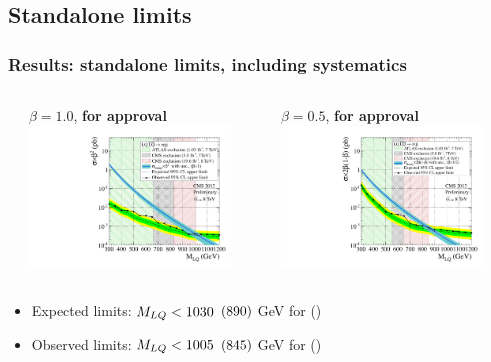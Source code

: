 \documentclass[bigger]{beamer}
\providecommand{\alert}[1]{\textbf{#1}}
\begin{document}
\subsection{Standalone limits}
\label{sec-5-1}
\begin{frame}
\frametitle{Results: standalone limits, including systematics}
\label{sec-5-1-1}
\begin{columns} %
\label{sec-5-1-1-1}
\begin{column}{0.5\textwidth}
\label{sec-5-1-1-1-1}

\centering
$\beta = 1.0$, \alert{for approval}
\includegraphics[width=0.875\textwidth]{fig/limits/BR_Sigma_EE.pdf}
\end{column}
\begin{column}{0.5\textwidth}
\label{sec-5-1-1-1-2}

\centering
$\beta = 0.5$, \alert{for approval}
\includegraphics[width=0.875\textwidth]{fig/limits/BR_Sigma_ENu.pdf}
\end{column}
\end{columns}
\label{sec-5-1-1-2}

\begin{itemize}
\item Expected limits: $M_{LQ} < 1030$ $(890)$ GeV for \eejj (\enujj)
\item Observed limits: $M_{LQ} < 1005$ $(845)$ GeV for \eejj (\enujj)
\end{itemize}
\end{frame}
\end{document}

